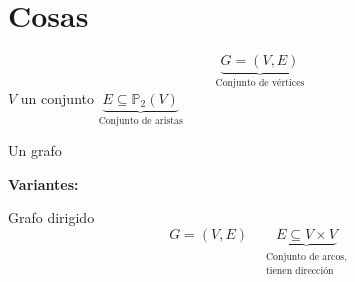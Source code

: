 \documentclass[../main.tex]{subfiles}
\begin{document}
\chapter{Cosas}%

\thispagestyle{fancy}

\[
	\underbrace
	{
		G=(V,E)
	}_
	{
		\text{Conjunto de vértices}
	}
\]
$V$ un conjunto
\(
	\underbrace
	{
		E\subseteq\mathbb{P}_2(V)
	}_
	{
		\text{Conjunto de aristas}
	}
\)

Un grafo

\textbf{Variantes:}

Grafo dirigido
\[
	G=(V,E)
	\quad
	\underbrace
	{
		E\subseteq V\times V
	}_
	{
		\substack
		{
			\text{Conjunto de arcos,}\\
			\text{tienen dirección}
		}
	}
\]
\begin{figure}[H]
	\centering
	
\end{figure}

\begin{figure}[H]
	\centering
	
\end{figure}

\begin{figure}[H]
	\centering
	
\end{figure}

\begin{figure}[H]
	\centering
	
\end{figure}
\end{document}
